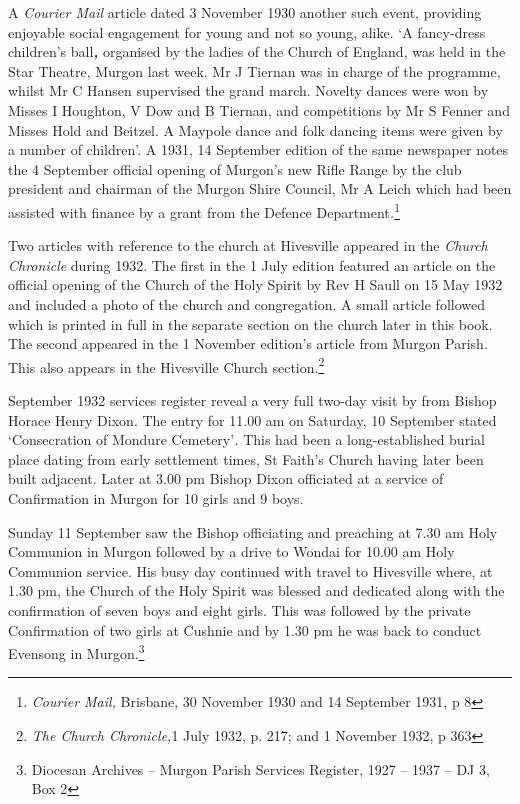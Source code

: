 A \emph{Courier Mail} article dated 3 November 1930 another such event, providing enjoyable social engagement for young and not so young, alike. `A fancy-dress children's ball\emph{\textbf{,}} organised by the ladies of the Church of England, was held in the Star Theatre, Murgon last week. Mr J Tiernan was in charge of the programme, whilst Mr C Hansen supervised the grand march. Novelty dances were won by Misses I Houghton, V Dow and B Tiernan, and competitions by Mr S Fenner and Misses Hold and Beitzel. A Maypole dance and folk dancing items were given by a number of children'. A 1931, 14 September edition of the same newspaper notes the 4 September official opening of Murgon's new Rifle Range by the club president and chairman of the Murgon Shire Council, Mr A Leich which had been assisted with finance by a grant from the Defence Department\emph{.}\footnote{\emph{Courier Mail,} Brisbane, 30 November 1930 and 14 September 1931, p 8}

Two articles with reference to the church at Hivesville appeared in the \emph{Church Chronicle} during 1932. The first in the 1 July edition featured an article on the official opening of the Church of the Holy Spirit by Rev H Saull on 15 May 1932 and included a photo of the church and congregation. A small article followed which is printed in full in the separate section on the church later in this book. The second appeared in the 1 November edition's article from Murgon Parish. This also appears in the Hivesville Church section.\footnote{\emph{The Church Chronicle,}1 July 1932, p. 217; and 1 November 1932, p 363}

September 1932 services register reveal a very full two-day visit by from Bishop Horace Henry Dixon. The entry for 11.00 am on Saturday, 10 September stated `Consecration of Mondure Cemetery'\emph{.} This had been a long-established burial place dating from early settlement times, St Faith's Church having later been built adjacent. Later at 3.00 pm Bishop Dixon officiated at a service of Confirmation in Murgon for 10 girls and 9 boys.

Sunday 11 September saw the Bishop officiating and preaching at 7.30 am Holy Communion in Murgon followed by a drive to Wondai for 10.00 am Holy Communion service. His busy day continued with travel to Hivesville where, at 1.30 pm, the Church of the Holy Spirit was blessed and dedicated along with the confirmation of seven boys and eight girls. This was followed by the private Confirmation of two girls at Cushnie and by 1.30 pm he was back to conduct Evensong in Murgon.\footnote{Diocesan Archives -- Murgon Parish Services Register, 1927 -- 1937 -- DJ 3, Box 2}

